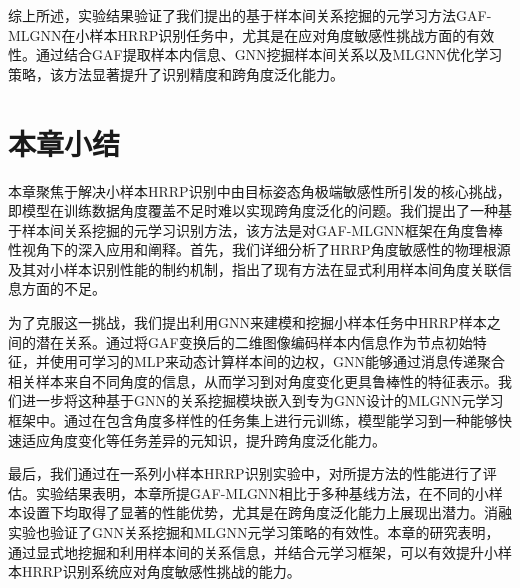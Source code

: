综上所述，实验结果验证了我们提出的基于样本间关系挖掘的元学习方法GAF-MLGNN在小样本HRRP识别任务中，尤其是在应对角度敏感性挑战方面的有效性。通过结合GAF提取样本内信息、GNN挖掘样本间关系以及MLGNN优化学习策略，该方法显著提升了识别精度和跨角度泛化能力。

\section{本章小结}
\label{sec:angle_summary}

本章聚焦于解决小样本HRRP识别中由目标姿态角极端敏感性所引发的核心挑战，即模型在训练数据角度覆盖不足时难以实现跨角度泛化的问题。我们提出了一种基于样本间关系挖掘的元学习识别方法，该方法是对GAF-MLGNN框架在角度鲁棒性视角下的深入应用和阐释。首先，我们详细分析了HRRP角度敏感性的物理根源及其对小样本识别性能的制约机制，指出了现有方法在显式利用样本间角度关联信息方面的不足。

为了克服这一挑战，我们提出利用GNN来建模和挖掘小样本任务中HRRP样本之间的潜在关系。通过将GAF变换后的二维图像编码样本内信息作为节点初始特征，并使用可学习的MLP来动态计算样本间的边权，GNN能够通过消息传递聚合相关样本来自不同角度的信息，从而学习到对角度变化更具鲁棒性的特征表示。我们进一步将这种基于GNN的关系挖掘模块嵌入到专为GNN设计的MLGNN元学习框架中。通过在包含角度多样性的任务集上进行元训练，模型能学习到一种能够快速适应角度变化等任务差异的元知识，提升跨角度泛化能力。

最后，我们通过在一系列小样本HRRP识别实验中，对所提方法的性能进行了评估。实验结果表明，本章所提GAF-MLGNN相比于多种基线方法，在不同的小样本设置下均取得了显著的性能优势，尤其是在跨角度泛化能力上展现出潜力。消融实验也验证了GNN关系挖掘和MLGNN元学习策略的有效性。本章的研究表明，通过显式地挖掘和利用样本间的关系信息，并结合元学习框架，可以有效提升小样本HRRP识别系统应对角度敏感性挑战的能力。
